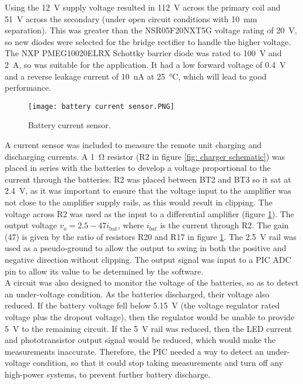 Using the \SI{12}{\volt} supply voltage resulted in \SI{112}{\volt} across the primary coil and \SI{51}{\volt} across the secondary (under open circuit conditions with \SI{10}{\milli\metre} separation). This was greater than the NSR05F20NXT5G voltage rating of \SI{20}{\volt}, so new diodes were selected for the bridge rectifier to handle the higher voltage. The NXP PMEG10020ELRX Schottky barrier diode \cite{new_diode} was rated to \SI{100}{\volt} and \SI{2}{\ampere}, so was suitable for the application. It had a low forward voltage of \SI{0.4}{\volt} and a reverse leakage current of \SI{10}{\nano\ampere} at \SI{25}{\celsius}, which will lead to good performance.\\




\begin{figure}[htb]
	\centering
	\texttt{[image: battery current sensor.PNG]}
	\caption{Battery current sensor.}
	\label{fig: battery current sensor}
\end{figure}

A current sensor was included to measure the remote unit charging and discharging currents. A \SI{1}{\ohm} resistor (R2 in figure \ref{fig: charger schematic}) was placed in series with the batteries to develop a voltage proportional to the current through the batteries. R2 was placed between BT2 and BT3 so it sat at \SI{2.4}{\volt}, as it was important to ensure that the voltage input to the amplifier was not close to the amplifier supply rails, as this would result in clipping. The voltage across R2 was used as the input to a differential amplifier (figure \ref{fig: battery current sensor}). The output voltage $v_o = 2.5 - 47 i_\text{bat}$, where $i_{bat}$ is the current through R2. The gain (47) is given by the ratio of resistors R20 and R17 in figure \ref{fig: battery current sensor}. The \SI{2.5}{\volt} rail was used as a pseudo-ground to allow the output to swing in both the positive and negative direction without clipping. The output signal was input to a PIC ADC pin to allow its value to be determined by the software.\\



A circuit was also designed to monitor the voltage of the batteries, so as to detect an under-voltage condition. As the batteries discharged, their voltage also reduced. If the battery voltage fell below \SI{5.15}{\volt} (the voltage regulator rated voltage plus the dropout voltage), then the regulator would be unable to provide \SI{5}{\volt} to the remaining circuit. If the \SI{5}{\volt} rail was reduced, then the LED current and phototransistor output signal would be reduced, which would make the measurements inaccurate. Therefore, the PIC needed a way to detect an under-voltage condition, so that it could stop taking measurements and turn off any high-power systems, to prevent further battery discharge.\\

